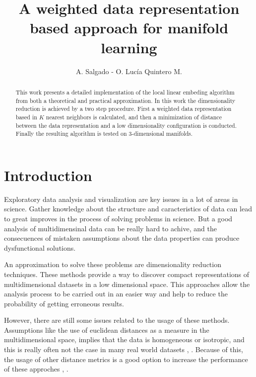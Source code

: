 \documentclass[12pt,journal]{IEEEtran}
\begin{document}
\title{A weighted data representation based approach for manifold learning}
\author{A. Salgado - O. Lucía Quintero M.}
\maketitle

\begin{abstract}
    This work presents a detailed implementation of the local linear embeding
    algorithm from both a theoretical and practical approximation. In this work
    the dimensionality reduction is achieved by a two step procedure. First a
    weighted data representation based in $K$ nearest neighbors is calculated,
    and then a minimization of distance between the data representation and a
    low dimensionality configuration is conducted. Finally the resulting
    algorithm is tested on 3-dimensional manifolds.
\end{abstract}

\section{Introduction}


Exploratory data analysis and visualization are key issues in a lot of areas
in science. Gather knowledge about the structure and caracteristics of data
can lead to great improves in the process of solving problems in science. But a
good analysis of multidimensinal data can be really hard to achive, and the
consecuences of mistaken assumptions about the data properties can produce
dysfunctional solutions.

\vspace{0.25cm}

An approximation to solve these problems are dimensionality reduction techniques.
These methods provide a way to discover compact representations of
multidimensional datasets in a low dimensional space. This approaches allow the
analysis process to be carried out in an easier way and help to reduce the
probability of getting erroneous results.

\vspace{0.25cm}

However, there are still some issues related to the usage of these methods.
Assumptions like the use of euclidean distances as a measure in the
multidimensional space, implies that the data is homogeneous or isotropic, and
this is really often not the case in many real world datasets
\cite{homogeneous1}, \cite{homogeneous2}. Because of this, the usage of other
distance metrics is a good option to increase the performance of these approches
\cite{dist1}, \cite{dist2}.
\end{document}
